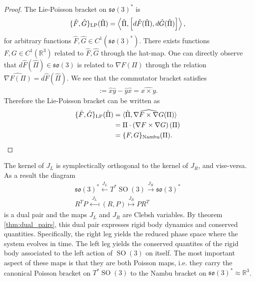 \documentclass[12pt]{amsart}
\newcommand{\so}{\ensuremath{\mathfrak{so}}}
\DeclareMathOperator{\SO}{SO}
\begin{document}
  \begin{proof}
    The Lie-Poisson bracket on $\so(3)^*$ is
    \begin{align*}
      \{ \hat{F} , \hat{G} \}_{\rm LP} (\hat{\Pi}) =
      \left \langle \hat{\Pi} , \left[ d\hat{F}(\hat{\Pi}) , d\hat{G}(\hat{\Pi}) \right]
        \right \rangle,
    \end{align*}
    for arbitrary functions $\hat{F},\hat{G} \in C^1(\so(3)^*)$.
    There exists functions $F,G \in C^1(\mathbb{R}^3)$ related to $\hat{F},\hat{G}$ through the hat-map.
    One can directly observe that $d\hat{F}(\hat{\Pi}) \in \so(3)$ is 
    related to $\nabla F(\Pi)$ through the relation $\widehat{ \nabla F(\Pi)} = d\hat{F}( \hat{\Pi})$.
    We see that the commutator bracket satisfies
    \begin{align*}
      [\hat{x},\hat{y} ] := \hat{x} \hat{y} - \hat{y} \hat{x} = \widehat{x \times y }.
    \end{align*}
    Therefore the Lie-Poisson bracket can be written as
    \begin{align*}
    \{ \hat{F} , \hat{G} \}_{\rm LP}(\hat{\Pi})
    &= \langle \hat{\Pi} , \widehat{ \nabla F \times \nabla G }(\Pi) \rangle \\
    &= \Pi \cdot  \left( \nabla F \times \nabla G \right)(\Pi) \\
    &= \{ F , G \}_{\rm Nambu}(\Pi).
    \end{align*}
  \end{proof}

  The kernel of $J_L$ is symplectically orthogonal
  to the kernel of $J_R$, and vise-versa.
  As a result the diagram
  \begin{align*}
    \so(3)^* \stackrel{J_L}{\longleftarrow}
    T^{\ast}\SO(3)
    \stackrel{J_R}{\longrightarrow} \so(3)^* \\
    R^T P \stackrel{J_L}{\longmapsfrom}
    (R,P)
    \stackrel{J_R}{\longmapsto} P R^T
  \end{align*}
  is a dual pair and the maps $J_L$ and $J_R$ are Clebsh variables.
  By theorem \ref{thm:dual_pairs}, this dual pair expresses rigid
  body dynamics and conserved quantities.
  Specifically, the right leg yields the reduced phase space where 
  the system evolves in time.
  The left leg yields the conserved quantites of the rigid body
  associated to the left action of $\SO(3)$ on itself.
  The most important aspect of these maps is that they are both Poisson
  maps, i.e. they carry the canonical Poisson bracket on $T^{\ast}\SO(3)$
  to the Nambu bracket on $\so(3)^* \approx \mathbb{R}^3$.
\end{document}
